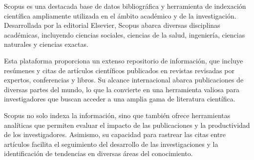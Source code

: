 Scopus es una destacada base de datos bibliográfica y herramienta de indexación científica ampliamente utilizada en el ámbito académico y de la investigación. Desarrollada por la editorial Elsevier, Scopus abarca diversas disciplinas académicas, incluyendo ciencias sociales, ciencias de la salud, ingeniería, ciencias naturales y ciencias exactas.

Esta plataforma proporciona un extenso repositorio de información, que incluye resúmenes y citas de artículos científicos publicados en revistas revisadas por expertos, conferencias y libros. Su alcance internacional abarca publicaciones de diversas partes del mundo, lo que la convierte en una herramienta valiosa para investigadores que buscan acceder a una amplia gama de literatura científica.

Scopus no solo indexa la información, sino que también ofrece herramientas analíticas que permiten evaluar el impacto de las publicaciones y la productividad de los investigadores. Asimismo, su capacidad para rastrear las citas entre artículos facilita el seguimiento del desarrollo de las investigaciones y la identificación de tendencias en diversas áreas del conocimiento.